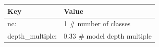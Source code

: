 \begin{table}[]
	\label{tab:yoloConfig}
	\begin{tabular}{|l|l|}
		\hline
		Key              & Value                                                                                                                                                                                                                                                                                                                                                                                                                                                                                                                                                                                                                                                                                                                                                                                                                                                                                                                                                                           \\ \hline
		nc:              & 1 \# number of classes                                                                                                                                                                                                                                                                                                                                                                                                                                                                                                                                                                                                                                                                                                                                                                                                                                                                                                                                                          \\ \hline
		depth\_multiple: & 0.33 \# model depth multiple                                                                                                                                                                                                                                                                                                                                                                                                                                                                                                                                                                                                                                                                                                                                                                                                                                                                                                                                                    \\ \hline

\end{tabular}
\end{table}
